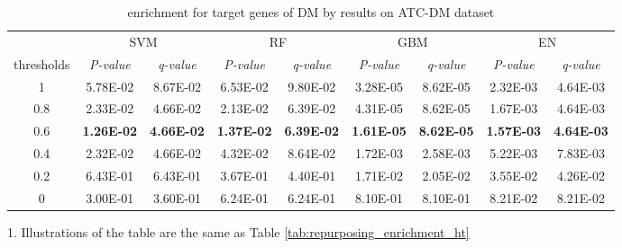       \begin{table}[htbp]
        \centering
        \caption{enrichment for target genes of DM by results on ATC-DM dataset}
        \begin{threeparttable}
          \tabcolsep=0.10cm
          \begin{tabular}{ccccccccc}
            \toprule
                  & \multicolumn{2}{c}{SVM} & \multicolumn{2}{c}{RF} & \multicolumn{2}{c}{GBM} & \multicolumn{2}{c}{EN} \\
            thresholds & \textit{P-value} & \textit{q-value} & \textit{P-value} & \textit{q-value} & \textit{P-value} & \textit{q-value} & \textit{P-value} & \textit{q-value} \\
            \midrule
            1     & 5.78E-02 & 8.67E-02 & 6.53E-02 & 9.80E-02 & 3.28E-05 & 8.62E-05 & 2.32E-03 & 4.64E-03 \\
            0.8   & 2.33E-02 & 4.66E-02 & 2.13E-02 & 6.39E-02 & 4.31E-05 & 8.62E-05 & 1.67E-03 & 4.64E-03 \\
            0.6   & \textbf{1.26E-02} & \textbf{4.66E-02} & \textbf{1.37E-02} & \textbf{6.39E-02} & \textbf{1.61E-05} & \textbf{8.62E-05} & \textbf{1.57E-03} & \textbf{4.64E-03} \\
            0.4   & 2.32E-02 & 4.66E-02 & 4.32E-02 & 8.64E-02 & 1.72E-03 & 2.58E-03 & 5.22E-03 & 7.83E-03 \\
            0.2   & 6.43E-01 & 6.43E-01 & 3.67E-01 & 4.40E-01 & 1.71E-02 & 2.05E-02 & 3.55E-02 & 4.26E-02 \\
            0     & 3.00E-01 & 3.60E-01 & 6.24E-01 & 6.24E-01 & 8.10E-01 & 8.10E-01 & 8.21E-02 & 8.21E-02 \\
            \bottomrule
            \end{tabular}%
            \begin{tablenotes}
              \item 1. Illustrations of the table are the same as Table \ref{tab:repurposing_enrichment_ht}
            \end{tablenotes}
          \end{threeparttable}
          \label{tab:repurposing_enrichment_dm}%
        \end{table}%

